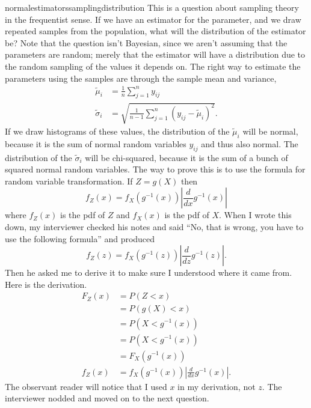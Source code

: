 \begin{answer}{normalestimatorssamplingdistribution}
This is a question about sampling theory in the frequentist sense.
If we have an estimator for the parameter, and we draw repeated samples from the population, what will the distribution of the estimator be?
Note that the question isn't Bayesian, since we aren't assuming that the parameters are random; merely that the estimator will have a distribution due to the random sampling of the values it depends on.
The right way to estimate the parameters using the samples are through the sample mean and variance,
\begin{align*}
  \tilde{\mu}_i &= \frac{1}{n}\sum_{j=1}^{n}{y_{ij}} \\
  \tilde{\sigma}_i &=
 \sqrt{ \frac{1}{n-1} \sum_{j=1}^{n}{(y_{ij} - \tilde{\mu}_i)^2} }
 \text{.}
\end{align*}
If we draw histograms of these values, the distribution of the
$\tilde{\mu}_i$
will be normal,
because it is the sum of normal random variables $y_{ij}$ and thus also normal.
The distribution of the
$\tilde{\sigma}_i$
will be chi-squared, because it is the sum of a bunch of squared normal random variables.
The way to prove this is to use the formula for random variable transformation.
If $Z = g(X)$
then
\[
  f_Z(x) =  f_X( g^{-1}(x) )\left| \frac{d}{dx} g^{-1}(x) \right|
\]
where
$f_Z(x)$ is the pdf of $Z$ and
$f_X(x)$ is the pdf of $X$.
When I wrote this down, my interviewer
checked his notes and said
``No, that is wrong, you have to use the following formula'' and produced
\[
  f_Z(z) =  f_X( g^{-1}(z) )\left| \frac{d}{dz} g^{-1}(z) \right|
  \text{.}
\]
Then he asked me to derive it to make sure I understood where it came from.
Here is the derivation.
\begin{align*}
  F_Z(x)
  &=  P(Z < x) \\
  &=  P(g(X) < x) \\
  &=  P(X < g^{-1}(x)) \\
  &=  P(X < g^{-1}(x)) \\
  &=  F_X( g^{-1}(x) ) \\
  f_Z(x) &=  f_X( g^{-1}(x) )\left| \frac{d}{dx} g^{-1}(x) \right|
  \text{.}
\end{align*}
The observant reader will notice that I used $x$ in my derivation, not $z$.
The interviewer nodded and moved on to the next question.
\end{answer}
